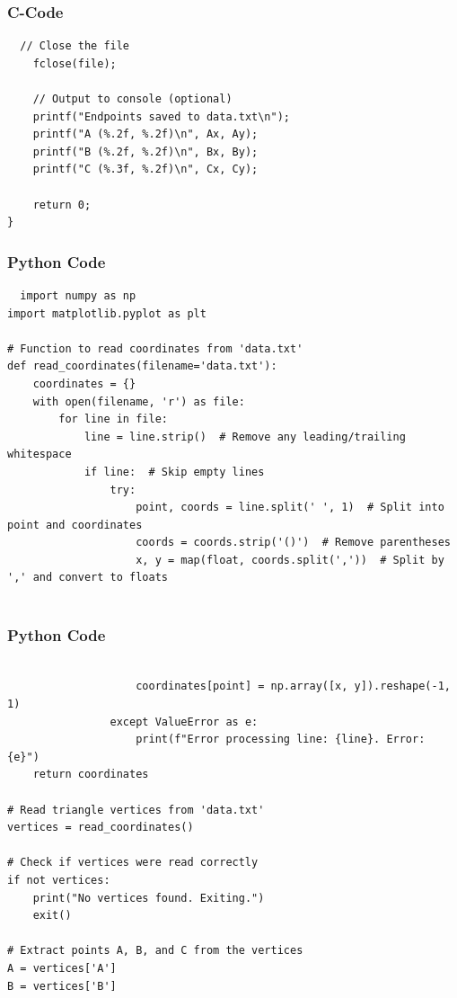 \documentclass{beamer}
\begin{document}
\begin{frame}[fragile]
\frametitle{C-Code}
\begin{verbatim}
  // Close the file
    fclose(file);

    // Output to console (optional)
    printf("Endpoints saved to data.txt\n");
    printf("A (%.2f, %.2f)\n", Ax, Ay);
    printf("B (%.2f, %.2f)\n", Bx, By);
    printf("C (%.3f, %.2f)\n", Cx, Cy);

    return 0;
}
\end{verbatim}
\end{frame}
\begin{frame}[fragile]
\frametitle{Python Code}
\begin{verbatim}
  import numpy as np
import matplotlib.pyplot as plt

# Function to read coordinates from 'data.txt'
def read_coordinates(filename='data.txt'):
    coordinates = {}
    with open(filename, 'r') as file:
        for line in file:
            line = line.strip()  # Remove any leading/trailing whitespace
            if line:  # Skip empty lines
                try:
                    point, coords = line.split(' ', 1)  # Split into point and coordinates
                    coords = coords.strip('()')  # Remove parentheses
                    x, y = map(float, coords.split(','))  # Split by ',' and convert to floats
                     
\end{verbatim}
\end{frame}
\begin{frame}[fragile]
\frametitle{Python Code}
\begin{verbatim}
                    
                    coordinates[point] = np.array([x, y]).reshape(-1, 1)
                except ValueError as e:
                    print(f"Error processing line: {line}. Error: {e}")
    return coordinates

# Read triangle vertices from 'data.txt'
vertices = read_coordinates()

# Check if vertices were read correctly
if not vertices:
    print("No vertices found. Exiting.")
    exit()

# Extract points A, B, and C from the vertices
A = vertices['A']
B = vertices['B']
\end{verbatim}
\end{frame}
\end{document}
